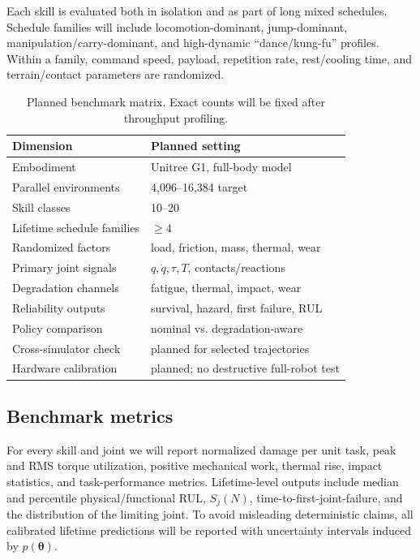 \documentclass[letterpaper,10pt,conference]{ieeeconf}
\begin{document}
Each skill is evaluated both in isolation and as part of long mixed schedules. Schedule families will include locomotion-dominant, jump-dominant, manipulation/carry-dominant, and high-dynamic ``dance/kung-fu'' profiles. Within a family, command speed, payload, repetition rate, rest/cooling time, and terrain/contact parameters are randomized.

\begin{table}[t]
\caption{Planned benchmark matrix. Exact counts will be fixed after throughput profiling.}
\label{tab:protocol}
\centering
\scriptsize
\begin{tabular}{@{}ll@{}}
\toprule
Dimension & Planned setting \\
\midrule
Embodiment & Unitree G1, full-body model \\
Parallel environments & 4,096--16,384 target \\
Skill classes & 10--20 \\
Lifetime schedule families & $\geq 4$ \\
Randomized factors & load, friction, mass, thermal, wear \\
Primary joint signals & $q,\dot q,\tau,T$, contacts/reactions \\
Degradation channels & fatigue, thermal, impact, wear \\
Reliability outputs & survival, hazard, first failure, RUL \\
Policy comparison & nominal vs. degradation-aware \\
Cross-simulator check & planned for selected trajectories \\
Hardware calibration & planned; no destructive full-robot test \\
\bottomrule
\end{tabular}
\end{table}

\subsection{Benchmark metrics}

For every skill and joint we will report normalized damage per unit task, peak and RMS torque utilization, positive mechanical work, thermal rise, impact statistics, and task-performance metrics. Lifetime-level outputs include median and percentile physical/functional RUL, $S_j(N)$, time-to-first-joint-failure, and the distribution of the limiting joint. To avoid misleading deterministic claims, all calibrated lifetime predictions will be reported with uncertainty intervals induced by $p(\boldsymbol{\theta})$.
\end{document}
